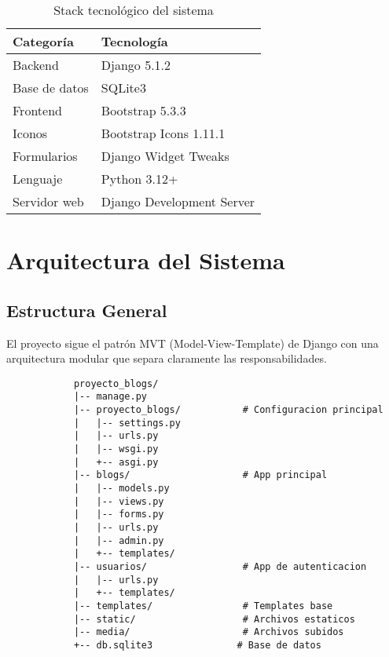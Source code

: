 \documentclass[11pt,a4paper]{report}
\begin{document}
	\begin{table}[h!]
		\centering
		\begin{tabular}{@{}ll@{}}
			\toprule
			\textbf{Categoría} & \textbf{Tecnología} \\
			\midrule
			Backend & Django 5.1.2 \\
			Base de datos & SQLite3 \\
			Frontend & Bootstrap 5.3.3 \\
			Iconos & Bootstrap Icons 1.11.1 \\
			Formularios & Django Widget Tweaks \\
			Lenguaje & Python 3.12+ \\
			Servidor web & Django Development Server \\
			\bottomrule
		\end{tabular}
		\caption{Stack tecnológico del sistema}
		\label{tab:tech-stack}
	\end{table}
	
	\section{Arquitectura del Sistema}
	
	\subsection{Estructura General}
	El proyecto sigue el patrón MVT (Model-View-Template) de Django con una arquitectura modular que separa claramente las responsabilidades.
	
	\begin{tcolorbox}[colback=blue!5!white,colframe=blue!75!black,title=Estructura del Proyecto]
		\begin{verbatim}
			proyecto_blogs/
			|-- manage.py
			|-- proyecto_blogs/           # Configuracion principal
			|   |-- settings.py
			|   |-- urls.py
			|   |-- wsgi.py
			|   +-- asgi.py
			|-- blogs/                    # App principal
			|   |-- models.py
			|   |-- views.py
			|   |-- forms.py
			|   |-- urls.py
			|   |-- admin.py
			|   +-- templates/
			|-- usuarios/                 # App de autenticacion
			|   |-- urls.py
			|   +-- templates/
			|-- templates/                # Templates base
			|-- static/                   # Archivos estaticos
			|-- media/                    # Archivos subidos
			+-- db.sqlite3               # Base de datos
		\end{verbatim}
	\end{tcolorbox}
	
\end{document}
